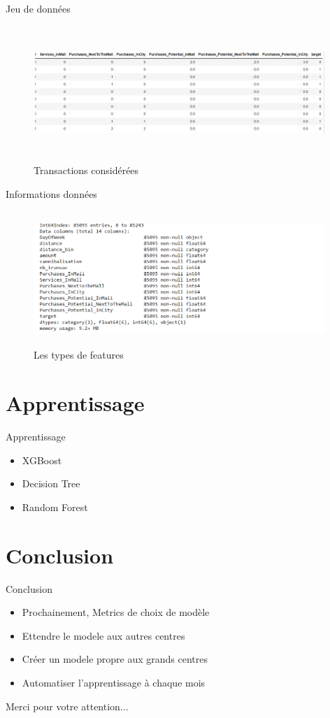 \documentclass{beamer}
\begin{document}
\begin{frame}{Jeu de données}
\begin{figure}[H]
    \includegraphics[width=11cm,height=5.1cm]{images/data_2.png}
    \caption{ Transactions considérées}
    \label{fig:L1}
\end{figure}
\end{frame} 
\begin{frame}{Informations données}
\begin{figure}[H]
    \includegraphics[width=11cm,height=5.1cm]{images/data_info.png}
    \caption{ Les types de features}
    \label{fig:L1}
\end{figure}
\end{frame} 

\section{Apprentissage}
\begin{frame}{Apprentissage}
\begin{itemize}
		\item XGBoost
		\item Decision Tree
		\item Random Forest
\end{itemize}
\end{frame}




\section{Conclusion}
\begin{frame}{Conclusion}
\begin{itemize}
		\item Prochainement, Metrics de choix de modèle
		\item Ettendre le modele aux autres centres
		\item Créer un modele propre aux grands centres
		\item Automatiser l'apprentissage à chaque mois
\end{itemize}
\end{frame}


\begin{frame}
  \begin{block}{}
  \centering
  Merci pour votre attention...
  \end{block}
\end{frame}
\end{document}

